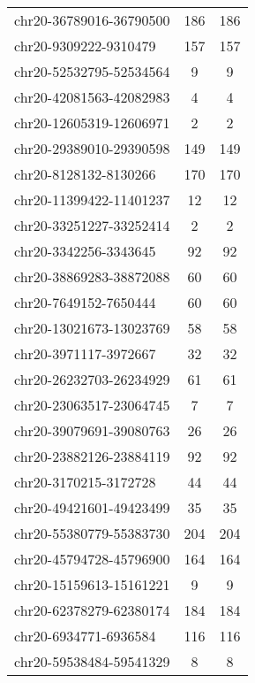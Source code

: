 \documentclass[10pt,letterpaper]{article}
\begin{document}
{\begin{longtable}{lSS}
	chr20-36789016-36790500 & 186    & 186                   \\
	chr20-9309222-9310479   & 157    & 157                   \\
	chr20-52532795-52534564 & 9      & 9                     \\
	chr20-42081563-42082983 & 4      & 4                     \\
	chr20-12605319-12606971 & 2      & 2                     \\
	chr20-29389010-29390598 & 149    & 149                   \\
	chr20-8128132-8130266   & 170    & 170                   \\
	chr20-11399422-11401237 & 12     & 12                    \\
	chr20-33251227-33252414 & 2      & 2                     \\
	chr20-3342256-3343645   & 92     & 92                    \\
	chr20-38869283-38872088 & 60     & 60                    \\
	chr20-7649152-7650444   & 60     & 60                    \\
	chr20-13021673-13023769 & 58     & 58                    \\
	chr20-3971117-3972667   & 32     & 32                    \\
	chr20-26232703-26234929 & 61     & 61                    \\
	chr20-23063517-23064745 & 7      & 7                     \\
	chr20-39079691-39080763 & 26     & 26                    \\
	chr20-23882126-23884119 & 92     & 92                    \\
	chr20-3170215-3172728   & 44     & 44                    \\
	chr20-49421601-49423499 & 35     & 35                    \\
	chr20-55380779-55383730 & 204    & 204                   \\
	chr20-45794728-45796900 & 164    & 164                   \\
	chr20-15159613-15161221 & 9      & 9                     \\
	chr20-62378279-62380174 & 184    & 184                   \\
	chr20-6934771-6936584   & 116    & 116                   \\
	chr20-59538484-59541329 & 8      & 8                     \\

\end{longtable}}
\end{document}
